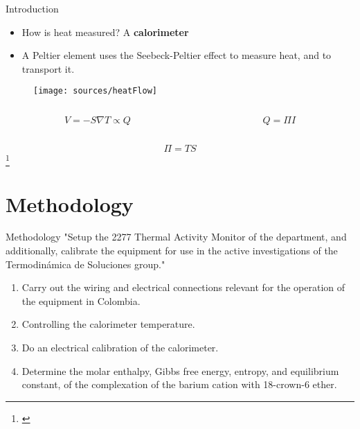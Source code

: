 \documentclass[handout]{beamer}
\newcommand\blfootnote[1]
{%
	\begingroup
	\renewcommand\thefootnote{}\footnote{#1}%
	\addtocounter{footnote}{-1}%
	\endgroup
}
\newcommand{\fcite}[1]{\blfootnote{\cite{#1}}}
\begin{document}
\begin{frame}{Introduction}
	\begin{itemize}
		\item How is heat measured?\hspace{1cm} A \textbf{calorimeter}
		\item A Peltier element uses the Seebeck-Peltier effect to measure heat, and to transport it.
	\end{itemize}
	\begin{figure}[h]
		\centering
		\texttt{[image: sources/heatFlow]}
	\end{figure}
	\begin{columns}
		\begin{column}{0.5\textwidth}
			\begin{equation}
				V = -S\nabla T \propto Q
			\end{equation}
		\end{column}
		\begin{column}{0.5\textwidth}
			\begin{equation}
				Q = \Pi I
			\end{equation}
		\end{column}
	\end{columns}
	\begin{equation}
		\Pi = TS
	\end{equation}
	\fcite{Suurkuusk}
\end{frame}

\section{Methodology}
\begin{frame}{Methodology}
	"Setup the 2277 Thermal Activity Monitor of the department, and additionally, calibrate the equipment for use in the active investigations of the Termodin\'amica de Soluciones group."
	\begin{enumerate}
		\item Carry out the wiring and electrical connections relevant for the operation of the equipment in Colombia.
		\item Controlling the calorimeter temperature.
		\item Do an electrical calibration of the calorimeter.
		\item Determine the molar enthalpy, Gibbs free energy, entropy, and equilibrium constant, of the complexation of the barium cation with 18-crown-6 ether.
	\end{enumerate}
\end{frame}
\end{document}
